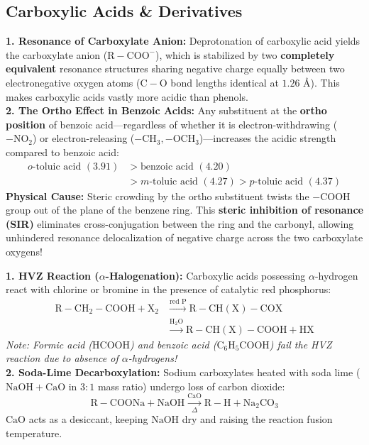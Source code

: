 \documentclass[10pt,twoside,openright]{book}
\begin{document}
\subsection{Carboxylic Acids \& Derivatives}

\begin{conceptbox}
\textbf{1. Resonance of Carboxylate Anion:}
Deprotonation of carboxylic acid yields the carboxylate anion ($\mathrm{R-COO^-}$), which is stabilized by two \textbf{completely equivalent} resonance structures sharing negative charge equally between two electronegative oxygen atoms ($\mathrm{C-O}$ bond lengths identical at $1.26\text{ \AA}$). This makes carboxylic acids vastly more acidic than phenols.\\
\textbf{2. The Ortho Effect in Benzoic Acids:}
Any substituent at the \textbf{ortho position} of benzoic acid—regardless of whether it is electron-withdrawing ($-\mathrm{NO_2}$) or electron-releasing ($-\mathrm{CH_3}, -\mathrm{OCH_3}$)—increases the acidic strength compared to benzoic acid:
\begin{align}
  o\text{-toluic acid } (3.91) &> \text{benzoic acid } (4.20) \\
  &> m\text{-toluic acid } (4.27) > p\text{-toluic acid } (4.37)
\end{align}
\textbf{Physical Cause:} Steric crowding by the ortho substituent twists the $-\mathrm{COOH}$ group out of the plane of the benzene ring. This \textbf{steric inhibition of resonance (SIR)} eliminates cross-conjugation between the ring and the carbonyl, allowing unhindered resonance delocalization of negative charge across the two carboxylate oxygens!
\end{conceptbox}

\begin{formulabox}
\textbf{1. HVZ Reaction ($\alpha$-Halogenation):}
Carboxylic acids possessing $\alpha$-hydrogen react with chlorine or bromine in the presence of catalytic red phosphorus:
\begin{align}
  \mathrm{R-CH_2-COOH} + \mathrm{X_2} &\xrightarrow{\text{red } \mathrm{P}} \mathrm{R-CH(X)-COX} \\
  &\xrightarrow{\mathrm{H_2O}} \mathbf{\mathrm{R-CH(X)-COOH}} + \mathrm{HX}
\end{align}
\textit{Note: Formic acid ($\mathrm{HCOOH}$) and benzoic acid ($\mathrm{C_6H_5COOH}$) fail the HVZ reaction due to absence of $\alpha$-hydrogens!}\\
\textbf{2. Soda-Lime Decarboxylation:}
Sodium carboxylates heated with soda lime ($\mathrm{NaOH} + \mathrm{CaO}$ in $3:1$ mass ratio) undergo loss of carbon dioxide:
\begin{equation}
  \mathrm{R-COONa} + \mathrm{NaOH} \xrightarrow[\Delta]{\mathrm{CaO}} \mathbf{\mathrm{R-H}} + \mathrm{Na_2CO_3}
\end{equation}
$\mathrm{CaO}$ acts as a desiccant, keeping $\mathrm{NaOH}$ dry and raising the reaction fusion temperature.
\end{formulabox}
\end{document}
